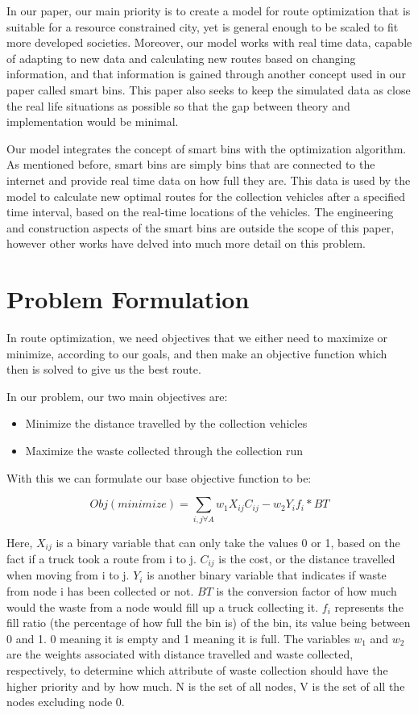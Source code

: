 \documentclass[12pt]{article}
\begin{document}
In our paper, our main priority is to create a model for route optimization that is suitable for a resource constrained city, yet is general enough to be scaled to fit more developed societies. Moreover, our model works with real time data, capable of adapting to new data and calculating new routes based on changing information, and that information is gained through another concept used in our paper called smart bins. This paper also seeks to keep the simulated data as close the real life situations as possible so that the gap between theory and implementation would be minimal.

Our model integrates the concept of smart bins with the optimization algorithm. As mentioned before, smart bins are simply bins that are connected to the internet and provide real time data on how full they are. This data is used by the model to calculate new optimal routes for the collection vehicles after a specified time interval, based on the real-time locations of the vehicles. The engineering and construction aspects of the smart bins are outside the scope of this paper, however other works have delved into much more detail on this problem.

\section{Problem Formulation}

In route optimization, we need objectives that we either need to maximize or minimize, according to our goals, and then make an objective function which then is solved to give us the best route. 

In our problem, our two main objectives are:
\begin{itemize}
    \item Minimize the distance travelled by the collection vehicles
    \item Maximize the waste collected through the collection run
\end{itemize}

With this we can formulate our base objective function to be:

\begin{equation}\label{eq1}
    Obj(minimize)=\sum_{i,j \forall A} w_1 X_{ij} C_{ij} - w_2 Y_i f_i * BT
\end{equation}

Here, $X_{ij}$ is a binary variable that can only take the values 0 or 1, based on the fact if a truck took a route from i to j. $C_{ij}$ is the cost, or the distance travelled when moving from i to j. $Y_{i}$ is another binary variable that indicates if waste from node i has been collected or not. $BT$ is the conversion factor of how much would the waste from a node would fill up a truck collecting it. $f_i$ represents the fill ratio (the percentage of how full the bin is) of the bin, its value being between 0 and 1. 0 meaning it is empty and 1 meaning it is full. The variables $w_1$ and $w_2$ are the weights associated with distance travelled and waste collected, respectively, to determine which attribute of waste collection should have the higher priority and by how much. N is the set of all nodes, V is the set of all the nodes excluding node 0.
\end{document}
